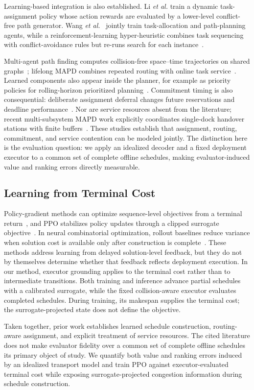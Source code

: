 Learning-based integration is also established. Li \emph{et al.}
\cite{li2024hierarchical} train a dynamic task-assignment policy whose action
rewards are evaluated by a lower-level conflict-free path generator. Wang
\emph{et al.}~\cite{wang2026collaborative} jointly train task-allocation and
path-planning agents, while a reinforcement-learning hyper-heuristic combines
task sequencing with conflict-avoidance rules but re-runs search for each
instance~\cite{li2024rlhh}.

Multi-agent path finding computes collision-free space--time trajectories on
shared graphs~\cite{stern2019mapf}; lifelong MAPD combines repeated routing
with online task service~\cite{ma2017lifelong}. Learned components also appear
inside the planner, for example as priority policies for rolling-horizon
prioritized planning~\cite{rlrhpp2026}. Commitment timing is also consequential:
deliberate assignment deferral changes future reservations and deadline
performance~\cite{noda2026deferral}. Nor are service resources absent from the
literature; recent multi-subsystem MAPD work explicitly coordinates
single-dock handover stations with finite buffers~\cite{zang2026buffers}.
These studies establish that assignment, routing, commitment, and service
contention can be modeled jointly. The distinction here is the evaluation
question: we apply an idealized decoder and a fixed deployment executor to a
common set of complete offline schedules, making evaluator-induced value and
ranking errors directly measurable.

\subsection{Learning from Terminal Cost}

Policy-gradient methods can optimize sequence-level objectives from a terminal
return~\cite{williams1992reinforce}, and PPO stabilizes policy updates through a
clipped surrogate objective~\cite{schulman2017ppo}. In neural combinatorial
optimization, rollout baselines reduce variance when solution cost is available
only after construction is complete~\cite{kool2019attention}. These methods
address learning from delayed solution-level feedback, but they do not by
themselves determine whether that feedback reflects deployment execution. In
our method, executor grounding applies to the terminal cost rather than to
intermediate transitions. Both training and inference advance partial
schedules with a calibrated surrogate, while the fixed collision-aware
executor evaluates completed schedules. During training, its makespan supplies
the terminal cost; the surrogate-projected state does not define the objective.

Taken together, prior work establishes learned schedule construction,
routing-aware assignment, and explicit treatment of service resources. The
cited literature does not make evaluator fidelity over a common set of complete
offline schedules its primary object of study. We quantify both value and
ranking errors induced by an idealized transport model and train PPO against
executor-evaluated terminal cost while exposing surrogate-projected congestion
information during schedule construction.
